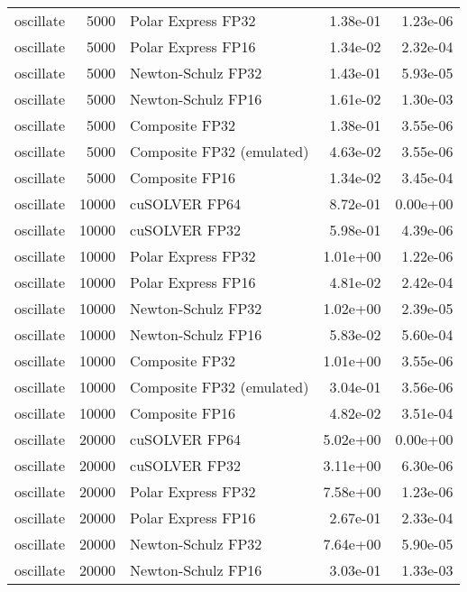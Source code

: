 \begin{table}
\begin{tabular}{lrlrr}
oscillate &  5000 &        Polar Express FP32 &  1.38e-01 &        1.23e-06 \\
oscillate &  5000 &        Polar Express FP16 &  1.34e-02 &        2.32e-04 \\
oscillate &  5000 &        Newton-Schulz FP32 &  1.43e-01 &        5.93e-05 \\
oscillate &  5000 &        Newton-Schulz FP16 &  1.61e-02 &        1.30e-03 \\
oscillate &  5000 &            Composite FP32 &  1.38e-01 &        3.55e-06 \\
oscillate &  5000 & Composite FP32 (emulated) &  4.63e-02 &        3.55e-06 \\
oscillate &  5000 &            Composite FP16 &  1.34e-02 &        3.45e-04 \\
oscillate & 10000 &             cuSOLVER FP64 &  8.72e-01 &        0.00e+00 \\
oscillate & 10000 &             cuSOLVER FP32 &  5.98e-01 &        4.39e-06 \\
oscillate & 10000 &        Polar Express FP32 &  1.01e+00 &        1.22e-06 \\
oscillate & 10000 &        Polar Express FP16 &  4.81e-02 &        2.42e-04 \\
oscillate & 10000 &        Newton-Schulz FP32 &  1.02e+00 &        2.39e-05 \\
oscillate & 10000 &        Newton-Schulz FP16 &  5.83e-02 &        5.60e-04 \\
oscillate & 10000 &            Composite FP32 &  1.01e+00 &        3.55e-06 \\
oscillate & 10000 & Composite FP32 (emulated) &  3.04e-01 &        3.56e-06 \\
oscillate & 10000 &            Composite FP16 &  4.82e-02 &        3.51e-04 \\
oscillate & 20000 &             cuSOLVER FP64 &  5.02e+00 &        0.00e+00 \\
oscillate & 20000 &             cuSOLVER FP32 &  3.11e+00 &        6.30e-06 \\
oscillate & 20000 &        Polar Express FP32 &  7.58e+00 &        1.23e-06 \\
oscillate & 20000 &        Polar Express FP16 &  2.67e-01 &        2.33e-04 \\
oscillate & 20000 &        Newton-Schulz FP32 &  7.64e+00 &        5.90e-05 \\
oscillate & 20000 &        Newton-Schulz FP16 &  3.03e-01 &        1.33e-03 \\

\end{tabular}
\end{table}
